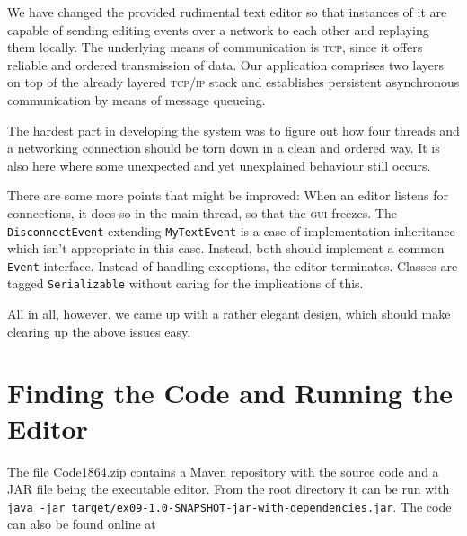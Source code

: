 \documentclass[a4paper,draft,12pt,oneside,article,table]{memoir}
\newcommand{\mil}[1]{\texttt{#1}}
\begin{document}
We have changed the provided rudimental text editor so that instances of
it are capable of sending editing events over a network to each other
and replaying them locally. The underlying means of communication is
\textsc{tcp}, since it offers reliable and ordered transmission of data. Our
application comprises two layers on top of the already layered \textsc{tcp/ip}
stack and establishes persistent asynchronous communication by means of
message queueing.

The hardest part in developing the system was to figure out how four
threads and a networking connection should be torn down in a clean and
ordered way. It is also here where some unexpected and yet unexplained
behaviour still occurs.

There are some more points that might be improved: When an editor
listens for connections, it does so in the main thread, so that the
\textsc{gui} freezes. The \mil{DisconnectEvent} extending
\mil{MyTextEvent} is a case of implementation inheritance which isn't
appropriate in this case. Instead, both should implement a common
\mil{Event} interface. Instead of handling exceptions, the editor
terminates. Classes are tagged \mil{Serializable} without caring for the
implications of this.

All in all, however, we came up with a rather elegant design, which
should make clearing up the above issues easy.

\appendix

\chapter{Finding the Code and Running the Editor}

The file Code1864.zip contains a Maven repository with the source code
and a JAR file being the executable editor. From the root directory it
can be run with \mil{java -jar
target/ex09-1.0-SNAPSHOT-jar-with-dependencies.jar}.
The code can also be found online at 

\end{document}
